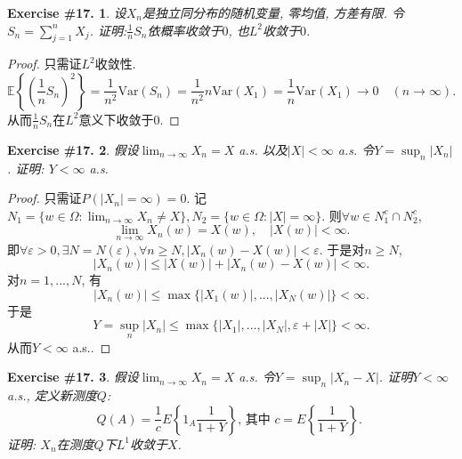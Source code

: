 \documentclass[UTF8, a4paper]{article}
\newtheorem{exercise}{Exercise \#17.}
\begin{document}
\begin{framed}
\begin{exercise}
设\(X_n\)是独立同分布的随机变量, 零均值, 方差有限.
令\(S_n = \sum_{j=1}^{n}X_j\).
证明:\(\frac{1}{n}S_n\)依概率收敛于\(0\), 也\(L^2\)收敛于\(0\).
\end{exercise}
\end{framed}

\begin{proof}
只需证\(L^2\)收敛性.
$$
\mathbb{E}\left\{\left(\frac{1}{n}S_n\right)^2\right\} = \frac{1}{n^2}\text{Var}(S_n) = \frac{1}{n^2}n\text{Var}(X_1) = \frac{1}{n}\text{Var}(X_1) \to 0 \quad (n\to \infty).
$$
从而\(\frac{1}{n}S_n\)在\(L^2\)意义下收敛于\(0\).
\end{proof}


\begin{framed}
\begin{exercise}
假设\(\lim_{n\to\infty} X_n = X\) a.s. 以及\(|X| < \infty\) a.s. 令\(Y = \sup_n |X_n|\).
证明: \(Y < \infty\) a.s.
\end{exercise}
\end{framed}

\begin{proof}
只需证\(P(|X_n| = \infty) = 0\).
记\(N_1 = \{w\in \Omega: \lim_{n\to\infty} X_n \neq X\}, N_2 = \{w\in\Omega: |X| = \infty\}\).
则\(\forall w\in N_1^c \cap N_2^c\), 
$$
\lim_{n\to\infty} X_n(w) = X(w), \quad |X(w)| < \infty.
$$
即\(\forall \varepsilon > 0, \exists N = N(\varepsilon), \forall n \geq N, |X_n(w) - X(w)| < \varepsilon\).
于是对\(n \geq N\), 
$$
|X_n(w)| \leq |X(w)| + |X_n(w) - X(w)| < \infty.
$$
对\(n = 1,...,N\), 有
$$
|X_n(w)| \leq \max\{|X_1(w)|, ..., |X_N(w)|\} < \infty.
$$
于是 
$$
Y = \sup_n |X_n| \leq \max\{|X_1|, ..., |X_N|, \varepsilon + |X|\} < \infty.
$$
从而\(Y < \infty\) a.s..


\end{proof}



\begin{framed}
\begin{exercise}
假设\(\lim_{n\to\infty} X_n = X\) a.s. 令\(Y = \sup_n|X_n - X|\).
证明\(Y < \infty\) a.s., 定义新测度\(Q\):
$$
Q(A)=\frac{1}{c} E\left\{1_A \frac{1}{1+Y}\right\} \text {, 其中 } c=E\left\{\frac{1}{1+Y}\right\} \text {. }
$$
证明: \(X_n\)在测度\(Q\)下\(L^1\)收敛于\(X\).
\end{exercise}
\end{framed}
\end{document}
